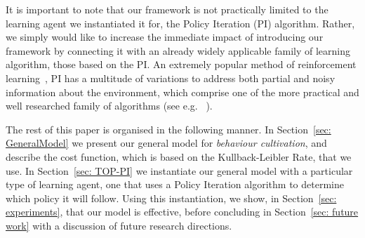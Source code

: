 It is important to note that our framework is not practically limited
to the learning agent we instantiated it for, the Policy Iteration
(PI) algorithm. Rather, we simply would like to increase the immediate
impact of introducing our framework by connecting it with an already
widely applicable family of learning algorithm, those based on the
PI. An extremely popular method of reinforcement
learning~\cite{sutton_barto_RL}, PI has a multitude of variations to
address both partial and noisy information about the environment,
which comprise one of the more practical and well researched family of
algorithms (see e.g. ~\cite{koller_parr_2000,
  perkins_precup_2003,vanRoy_98,sato_kobayashi_2000,lagoudakis_parr_2003,sugiyama_et_al_2009}).


The rest of this paper is organised in the following manner. In
Section~\ref{sec: GeneralModel} we present our general model for
\emph{behaviour cultivation}, and describe the cost function, which is
based on the Kullback-Leibler Rate, that we use.  In Section~\ref{sec:
  TOP-PI} we instantiate our general model with a particular type of
learning agent, one that uses a Policy Iteration algorithm to
determine which policy it will follow. Using this instantiation, we
show, in Section~\ref{sec: experiments}, that our model is effective,
before concluding in Section~\ref{sec: future work} with a discussion
of future research directions.



